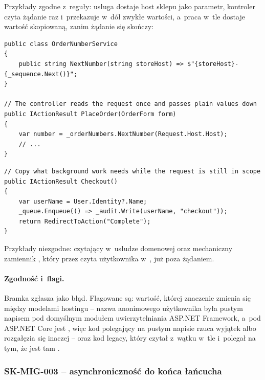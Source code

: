 Przykłady zgodne z~reguły: usługa dostaje host sklepu jako parametr, kontroler czyta
żądanie raz i~przekazuje w~dół zwykłe wartości, a~praca w~tle dostaje wartość skopiowaną,
zanim żądanie się skończy:

\begin{lstlisting}
public class OrderNumberService
{
    public string NextNumber(string storeHost) => $"{storeHost}-{_sequence.Next()}";
}

// The controller reads the request once and passes plain values down
public IActionResult PlaceOrder(OrderForm form)
{
    var number = _orderNumbers.NextNumber(Request.Host.Host);
    // ...
}
\end{lstlisting}

\begin{lstlisting}
// Copy what background work needs while the request is still in scope
public IActionResult Checkout()
{
    var userName = User.Identity?.Name;
    _queue.Enqueue(() => _audit.Write(userName, "checkout"));
    return RedirectToAction("Complete");
}
\end{lstlisting}

Przykłady niezgodne:  czytający
 w~usłudze domenowej oraz mechaniczny zamiennik
, który przez  czyta użytkownika
w~, już poza żądaniem.

\paragraph{Zgodność i~flagi.} Bramka zgłasza  jako
błąd. Flagowane są: wartość, której znaczenie zmienia się między modelami hostingu -- nazwa
anonimowego użytkownika była pustym napisem pod domyślnym modułem uwierzytelniania ASP.NET
Framework, a~pod ASP.NET Core jest , więc kod polegający na pustym napisie
rzuca wyjątek albo rozgałęzia się inaczej -- oraz kod legacy, który czytał
 z~wątku w~tle i~polegał na tym, że jest tam .


\subsubsection{SK-MIG-003 -- asynchroniczność do końca łańcucha}\label{sec:standardy-sk-mig-003}

